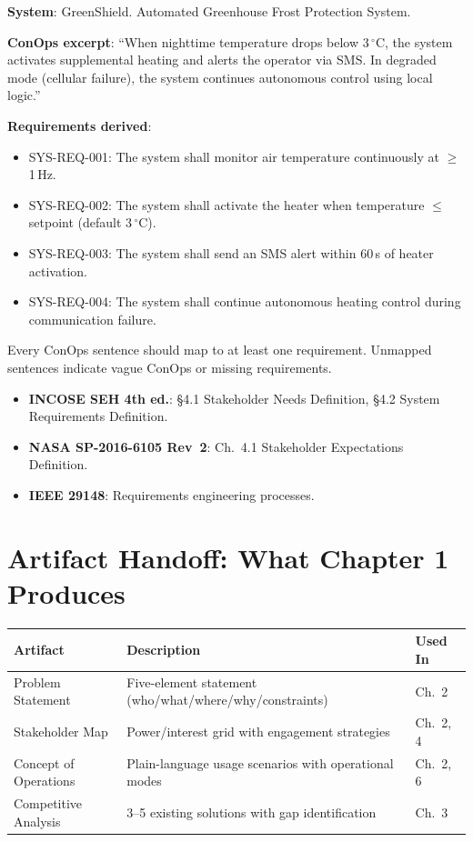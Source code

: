 \documentclass[11pt,letterpaper,twoside,openany]{book}
\newcommand{\degC}{\ensuremath{{}^{\circ}\text{C}}}
\begin{document}
\begin{greenshieldbox}
\textbf{System}: GreenShield. Automated Greenhouse Frost Protection System.

\textbf{ConOps excerpt}: ``When nighttime temperature drops below 3\,\degC{}, the system activates supplemental heating and alerts the operator via SMS. In degraded mode (cellular failure), the system continues autonomous control using local logic.''

\textbf{Requirements derived}:
\begin{itemize}[nosep,leftmargin=1.5em]
\item SYS-REQ-001: The system shall monitor air temperature continuously at $\geq$1\,Hz.
\item SYS-REQ-002: The system shall activate the heater when temperature $\leq$ setpoint (default 3\,\degC{}).
\item SYS-REQ-003: The system shall send an SMS alert within 60\,s of heater activation.
\item SYS-REQ-004: The system shall continue autonomous heating control during communication failure.
\end{itemize}
Every ConOps sentence should map to at least one requirement. Unmapped sentences indicate vague ConOps or missing requirements.
\end{greenshieldbox}

\begin{keyconceptbox}
\begin{itemize}[nosep,leftmargin=1.5em]
\item \textbf{INCOSE SEH 4th ed.}: \S4.1 Stakeholder Needs Definition, \S4.2 System Requirements Definition.
\item \textbf{NASA SP-2016-6105 Rev~2}: Ch.~4.1 Stakeholder Expectations Definition.
\item \textbf{IEEE 29148}: Requirements engineering processes.
\end{itemize}
\end{keyconceptbox}

\section{Artifact Handoff: What Chapter 1 Produces}
\begin{table}[htbp]\centering\small
\begin{tabularx}{\textwidth}{l X l}
\toprule
\textbf{Artifact} & \textbf{Description} & \textbf{Used In} \\
\midrule
Problem Statement & Five-element statement (who/what/where/why/constraints) & Ch.~2 \\
Stakeholder Map & Power/interest grid with engagement strategies & Ch.~2, 4 \\
Concept of Operations & Plain-language usage scenarios with operational modes & Ch.~2, 6 \\
Competitive Analysis & 3--5 existing solutions with gap identification & Ch.~3 \\
\bottomrule
\end{tabularx}
\end{table}
\end{document}
